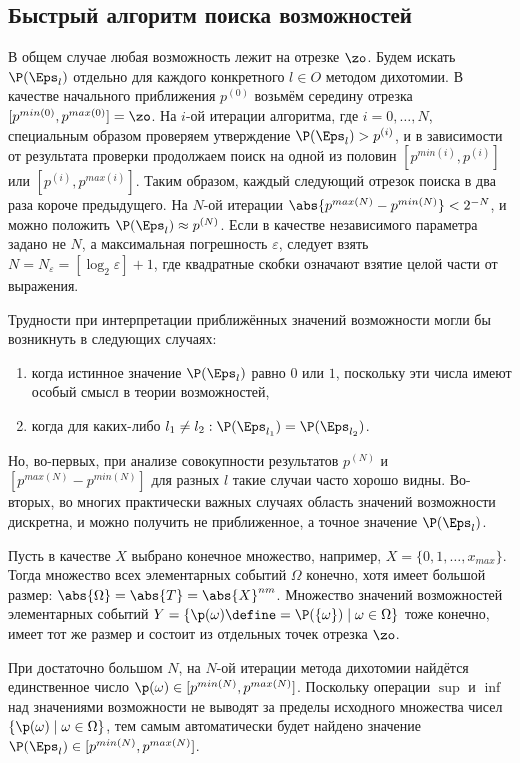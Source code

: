 \subsection{Быстрый алгоритм поиска возможностей}

В общем случае любая возможность лежит на отрезке $\zo$. Будем искать $\P(\Eps_l)$ отдельно для каждого конкретного $l \in O$ методом дихотомии. В качестве начального приближения $p^{(0)}$ возьмём середину отрезка $[p^{min(0)}, p^{max(0)}] = \zo$. На $i$-ой итерации алгоритма, где $i = 0, \ldots, N$, специальным образом проверяем утверждение $\P(\Eps_l) > p^{(i)}$, и в зависимости от результата проверки продолжаем поиск на одной из половин $[p^{min(i)}, p^{(i)}]$ или $[p^{(i)}, p^{max(i)}]$. Таким образом, каждый следующий отрезок поиска в два раза короче предыдущего.  На $N$-ой итерации $\abs{p^{max(N)} - p^{min(N)}} < 2^{-N}$, и можно положить $\P(\Eps_l) \approx p^{(N)}$. Если в качестве независимого параметра задано не $N$, а максимальная погрешность  $\varepsilon$, следует взять $N = N_{\varepsilon} = [\log_2{\varepsilon}]+1$,  где квадратные скобки означают взятие целой части от выражения. 

Трудности при интерпретации приближённых значений возможности могли бы возникнуть в следующих случаях:
\begin{enumerate}
  \item когда истинное значение $\P(\Eps_l)$ равно $0$ или $1$, поскольку эти числа имеют особый смысл в теории возможностей,
  \item когда для каких-либо $l_1 \neq l_2: \P(\Eps_{l_1}) = \P(\Eps_{l_2})$.
\end{enumerate}

Но, во-первых, при анализе совокупности результатов $p^{(N)}$ и $[p^{max(N)} - p^{min(N)}]$ для разных $l$ такие случаи часто хорошо видны. Во-вторых, во многих практически важных случаях область значений возможности дискретна, и можно получить не приближенное, а точное значение $\P(\Eps_l)$. 

Пусть в качестве $X$ выбрано конечное множество, например, $X = \{0, 1, \ldots, x_{max}\}$. Тогда множество всех элементарных событий $\Omega$ конечно, хотя имеет большой размер: $\abs{\Omega}= \abs{T} = \abs{X}^{nm}$. Множество значений возможностей элементарных событий $Y = \{\p(\omega) \define= \P(\{\omega\})\mid\omega\in\Omega\}$ тоже конечно, имеет тот же размер и состоит из отдельных точек отрезка $\zo$. 

При достаточно большом $N$, на $N$-ой итерации метода дихотомии найдётся единственное число $\p(\omega)\in[p^{min(N)}, p^{max(N)}]$. Поскольку операции $\sup$ и $\inf$ над значениями возможности не выводят за пределы исходного множества чисел $\{\p(\omega) \mid\omega\in\Omega\}$, тем самым автоматически будет найдено значение $\P(\Eps_l) \in [p^{min(N)}, p^{max(N)}]$.  

